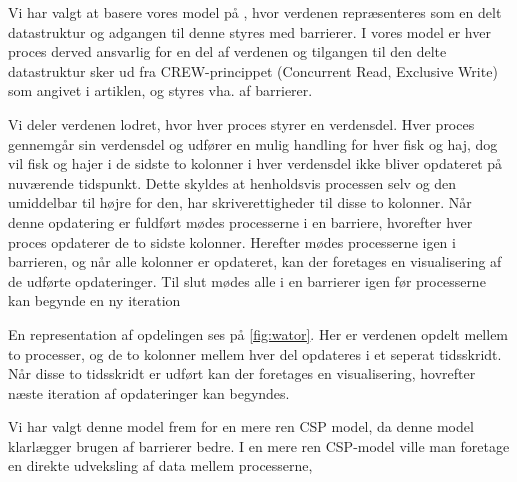 Vi har valgt at basere vores model på \cite{crew}, hvor verdenen repræsenteres 
som en delt datastruktur og adgangen til denne styres med barrierer. I vores 
model er hver proces derved ansvarlig for en del af verdenen og tilgangen til 
den delte datastruktur sker ud fra CREW-princippet (Concurrent Read, Exclusive 
Write) som angivet i artiklen, og styres vha. af barrierer. 

Vi deler verdenen lodret, hvor hver proces styrer en verdensdel. Hver proces 
gennemgår sin verdensdel og udfører en mulig handling for hver fisk og haj, dog 
vil fisk og hajer i de sidste to kolonner i hver verdensdel ikke bliver 
opdateret på nuværende tidspunkt. Dette skyldes at henholdsvis processen selv 
og den umiddelbar til højre for den, har skriverettigheder til disse to 
kolonner.
Når denne opdatering er fuldført mødes processerne i en barriere, hvorefter 
hver proces opdaterer de to sidste kolonner. Herefter mødes processerne igen i 
barrieren, og når alle kolonner er opdateret, kan der foretages en 
visualisering af de udførte opdateringer. Til slut mødes alle i en barrierer igen før processerne kan begynde en ny iteration 

En representation af opdelingen ses på \autoref{fig:wator}. Her er verdenen 
opdelt mellem to processer, og de to kolonner mellem hver del opdateres i et 
seperat tidsskridt. Når disse to tidsskridt er udført kan der foretages en 
visualisering, hovrefter næste iteration af opdateringer kan begyndes.  

Vi har valgt denne model frem for en mere ren CSP model, da denne model 
klarlægger brugen af barrierer bedre. I en mere ren CSP-model ville man 
foretage en direkte udveksling af data mellem 
processerne, 


